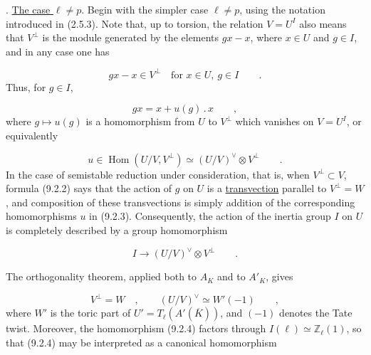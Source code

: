 
\medskip
{}. \underline{The case $\ell\neq p$}. Begin with the simpler case
$\ell\neq p$, using the notation introduced in (2.5.3). Note that,
up to torsion, the relation $V=U^I$ also means that $V^{\perp}$ is
the module generated by the elements $gx-x$, where $x\in U$ and
$g\in I$, and in any case one has

\begin{equation}\tag{9.2.1}
gx-x\in V^{\perp}\quad\text{for }x\in U,\ g\in I \qquad .
\end{equation}
Thus, for $g\in I$,

\begin{equation}\tag{9.2.2}
gx=x+u(g)\mathbin{.}x \qquad ,
\end{equation}
where $g\longmapsto u(g)$ is a homomorphism from $U$ to
$V^{\perp}$ which vanishes on $V=U^I$, or equivalently

\begin{equation}\tag{9.2.3}
u\in\operatorname{Hom}(U/V,V^{\perp})
 \simeq (U/V)^{\vee}\otimes V^{\perp} \qquad .
\end{equation}
In the case of semistable reduction under consideration, that is,
when $V^{\perp}\subset V$, formula (9.2.2) says that the action of
$g$ on $U$ is a \underline{transvection} parallel to
$V^{\perp}=W$, and composition of these transvections is simply
addition of the corresponding homomorphisms $u$ in (9.2.3).
Consequently, the action of the inertia group $I$ on $U$ is
completely described by a group homomorphism

\begin{equation}\tag{9.2.4}
I\longrightarrow (U/V)^{\vee}\otimes V^{\perp} \qquad .
\end{equation}

The orthogonality theorem, applied both to $A_K$ and to $A'_K$,
gives

\begin{equation*}
V^{\perp}=W \quad , \qquad
(U/V)^{\vee}\simeq W'(-1) \qquad ,
\end{equation*}
where $W'$ is the toric part of
$U'=T_{\ell}(A'(\overline K))$, and $(-1)$ denotes the Tate twist.
Moreover, the homomorphism (9.2.4) factors through
$I(\ell)\simeq\mathbb{Z}_{\ell}(1)$, so that (9.2.4) may be
interpreted as a canonical homomorphism

